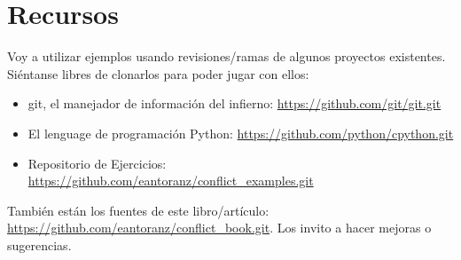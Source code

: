 
\section{Recursos}

Voy a utilizar ejemplos usando revisiones/ramas de algunos proyectos existentes. Siéntanse libres de clonarlos
para poder jugar con ellos:

\begin{itemize}

	\item git, el manejador de información del infierno: \url{https://github.com/git/git.git}
	\label{git_repo}

	\item El lenguage de programación Python: \url{https://github.com/python/cpython.git}
	\label{python_repo}
	
	\item Repositorio de Ejercicios: \url{https://github.com/eantoranz/conflict_examples.git}
	\label{exercises_repo}

\end{itemize}

También están los fuentes de este libro/artículo: \url{https://github.com/eantoranz/conflict_book.git}.
Los invito a hacer mejoras o sugerencias.
